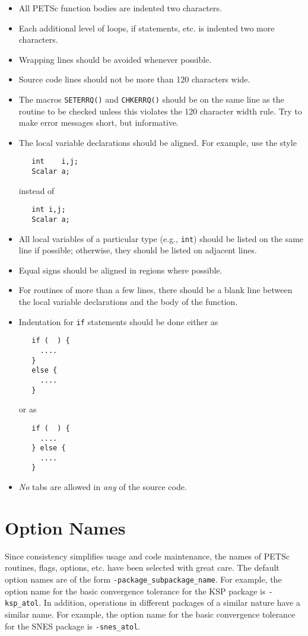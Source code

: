 \begin{itemize}
\item All PETSc function bodies are indented two characters.
\item Each additional level of loops, if statements, etc. is indented
      two more characters.
\item Wrapping lines should be avoided whenever possible.
\item Source code lines should not be more than 120 characters wide.
\item The macros {\tt SETERRQ()} and {\tt CHKERRQ()} should be on the 
      same line as the routine to be checked unless this violates the 
      120 character width rule. Try to make error messages short, but 
      informative.
\item The local variable declarations should be aligned. For example,
      use the style
\begin{verbatim}
   int    i,j;
   Scalar a;
\end{verbatim}
instead of
\begin{verbatim}
   int i,j;
   Scalar a;
\end{verbatim}
\item All local variables of a particular type (e.g., {\tt int}) should be 
      listed on the same line if possible; otherwise, they should be listed
      on adjacent lines.
\item Equal signs should be aligned in regions where possible.
\item For routines of more than a few lines, there should be a blank line
      between the local variable declarations and the body of the function.
\item Indentation for {\tt if} statements should be done either as
\begin{verbatim}
   if (  ) {
     ....
   }
   else {
     ....
   }
\end{verbatim}
or as
\begin{verbatim}
   if (  ) {
     ....
   } else {
     ....
   }
\end{verbatim}
\item {\em No} tabs are allowed in {\em any} of the source code.
\end{itemize}

\section{Option Names}

Since consistency simplifies usage and code maintenance, the names of
PETSc routines, flags, options, etc. have been selected with great care.
The default option names are of the form {\tt -package\_subpackage\_name}.  
For example, the option name for the basic convergence tolerance for 
the KSP package is {\tt -ksp\_atol}. In addition, operations in different 
packages of a similar nature have a similar name.  For example, the option
name for the basic convergence tolerance for the SNES package is 
{\tt -snes\_atol}.

